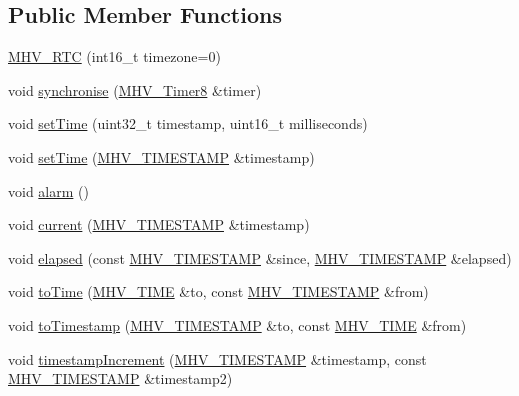 \subsection*{\-Public \-Member \-Functions}
\begin{DoxyCompactItemize}
\item 
\hyperlink{class_m_h_v___r_t_c_ae896730a55cb1a66917a6fa627dfeeaf}{\-M\-H\-V\-\_\-\-R\-T\-C} (int16\-\_\-t timezone=0)
\item 
void \hyperlink{class_m_h_v___r_t_c_a011003300b13539ef2a8df39fe8ff0cb}{synchronise} (\hyperlink{class_m_h_v___timer8}{\-M\-H\-V\-\_\-\-Timer8} \&timer)
\item 
void \hyperlink{class_m_h_v___r_t_c_a426e7a34e8a3957d378a634c2c2d00d8}{set\-Time} (uint32\-\_\-t timestamp, uint16\-\_\-t milliseconds)
\item 
void \hyperlink{class_m_h_v___r_t_c_a9eba3cfa73969390764bea958ed276ab}{set\-Time} (\hyperlink{_m_h_v___r_t_c_8h_a1e30d3a92b1b868286bd0d619245d8a6}{\-M\-H\-V\-\_\-\-T\-I\-M\-E\-S\-T\-A\-M\-P} \&timestamp)
\item 
void \hyperlink{class_m_h_v___r_t_c_a949570f89977560cc68dc909e7d0a805}{alarm} ()
\item 
void \hyperlink{class_m_h_v___r_t_c_ad01b7a3e8049fb64bf9f490e97b89696}{current} (\hyperlink{_m_h_v___r_t_c_8h_a1e30d3a92b1b868286bd0d619245d8a6}{\-M\-H\-V\-\_\-\-T\-I\-M\-E\-S\-T\-A\-M\-P} \&timestamp)
\item 
void \hyperlink{class_m_h_v___r_t_c_ac29cd961ae085c0b19e439f6a41c2941}{elapsed} (const \hyperlink{_m_h_v___r_t_c_8h_a1e30d3a92b1b868286bd0d619245d8a6}{\-M\-H\-V\-\_\-\-T\-I\-M\-E\-S\-T\-A\-M\-P} \&since, \hyperlink{_m_h_v___r_t_c_8h_a1e30d3a92b1b868286bd0d619245d8a6}{\-M\-H\-V\-\_\-\-T\-I\-M\-E\-S\-T\-A\-M\-P} \&elapsed)
\item 
void \hyperlink{class_m_h_v___r_t_c_aa0a908785e5445b1ab5d3bdb20f5fc62}{to\-Time} (\hyperlink{_m_h_v___r_t_c_8h_adace8912943ac21c837360427880df71}{\-M\-H\-V\-\_\-\-T\-I\-M\-E} \&to, const \hyperlink{_m_h_v___r_t_c_8h_a1e30d3a92b1b868286bd0d619245d8a6}{\-M\-H\-V\-\_\-\-T\-I\-M\-E\-S\-T\-A\-M\-P} \&from)
\item 
void \hyperlink{class_m_h_v___r_t_c_a3aecb460c309ca773933e0c82bbd7819}{to\-Timestamp} (\hyperlink{_m_h_v___r_t_c_8h_a1e30d3a92b1b868286bd0d619245d8a6}{\-M\-H\-V\-\_\-\-T\-I\-M\-E\-S\-T\-A\-M\-P} \&to, const \hyperlink{_m_h_v___r_t_c_8h_adace8912943ac21c837360427880df71}{\-M\-H\-V\-\_\-\-T\-I\-M\-E} \&from)
\item 
void \hyperlink{class_m_h_v___r_t_c_a666d907f0699c61337891adb040d5114}{timestamp\-Increment} (\hyperlink{_m_h_v___r_t_c_8h_a1e30d3a92b1b868286bd0d619245d8a6}{\-M\-H\-V\-\_\-\-T\-I\-M\-E\-S\-T\-A\-M\-P} \&timestamp, const \hyperlink{_m_h_v___r_t_c_8h_a1e30d3a92b1b868286bd0d619245d8a6}{\-M\-H\-V\-\_\-\-T\-I\-M\-E\-S\-T\-A\-M\-P} \&timestamp2)

\end{DoxyCompactItemize}
